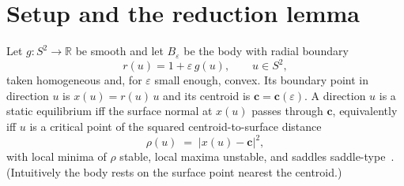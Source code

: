 \documentclass[11pt,a4paper]{article}
\theoremstyle{definition}
\begin{document}
\section{Setup and the reduction lemma}\label{sec:setup}

Let $g:S^2\to\mathbb{R}$ be smooth and let $B_\varepsilon$ be the body with radial boundary
\begin{equation}
r(u) = 1 + \varepsilon\, g(u), \qquad u\in S^2,
\label{eq:body}
\end{equation}
taken homogeneous and, for $\varepsilon$ small enough, convex. Its boundary point in direction $u$ is
$x(u)=r(u)\,u$ and its centroid is $\mathbf{c}=\mathbf{c}(\varepsilon)$. A direction $u$ is a static
equilibrium iff the surface normal at $x(u)$ passes through $\mathbf{c}$, equivalently iff $u$ is a critical
point of the squared centroid-to-surface distance
\begin{equation}
\rho(u) \;=\; \lvert x(u)-\mathbf{c}\rvert^2,
\label{eq:rho}
\end{equation}
with local minima of $\rho$ stable, local maxima unstable, and saddles
saddle-type~\cite{varkonyi2006b}. (Intuitively the body rests on the surface point nearest the centroid.)
\end{document}
